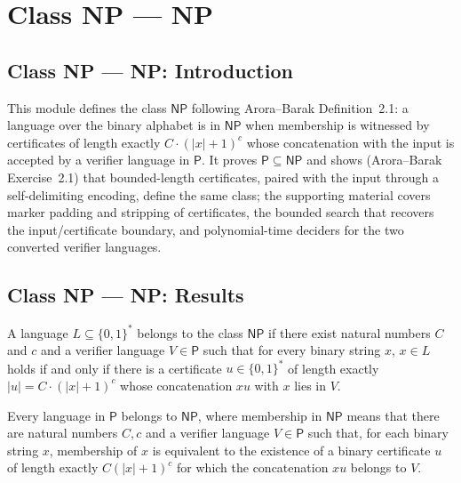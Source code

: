 \section{Class NP --- NP}
\subsection*{Class NP --- NP: Introduction}

This module defines the class $\mathsf{NP}$ following Arora--Barak
Definition~2.1: a language over the binary alphabet is in $\mathsf{NP}$ when
membership is witnessed by certificates of length exactly $C \cdot (|x|+1)^c$
whose concatenation with the input is accepted by a verifier language in
$\mathsf{P}$. It proves $\mathsf{P} \subseteq \mathsf{NP}$ and shows
(Arora--Barak Exercise~2.1) that bounded-length certificates, paired with the
input through a self-delimiting encoding, define the same class; the supporting
material covers marker padding and stripping of certificates, the bounded search
that recovers the input/certificate boundary, and polynomial-time deciders for
the two converted verifier languages.

\subsection*{Class NP --- NP: Results}

\begin{definition}
\label{Complexity.NP}
\leanok
{}
A language $L \subseteq \{0,1\}^{*}$ belongs to the class $\mathsf{NP}$ if there
exist natural numbers $C$ and $c$ and a verifier language $V \in \mathsf{P}$ such
that for every binary string $x$, $x \in L$ holds if and only if there is a
certificate $u \in \{0,1\}^{*}$ of length exactly $|u| = C \cdot (|x|+1)^c$ whose
concatenation $xu$ with $x$ lies in $V$.
\end{definition}

\begin{theorem}
\label{Complexity.P_subset_NP}
\leanok
{}
Every language in $\mathsf{P}$ belongs to $\mathsf{NP}$, where membership in
$\mathsf{NP}$ means that there are natural numbers $C,c$ and a verifier language
$V\in\mathsf{P}$ such that, for each binary string $x$, membership of $x$ is equivalent
to the existence of a binary certificate $u$ of length exactly $C(|x|+1)^c$ for which
the concatenation $xu$ belongs to $V$.
\end{theorem}

